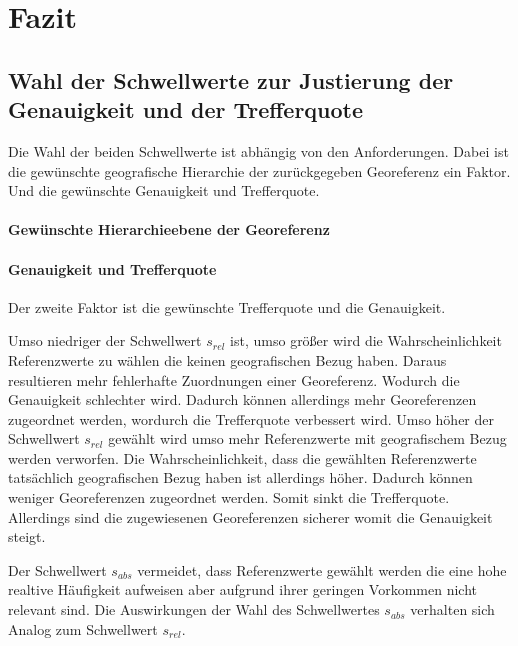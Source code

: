 
	\section{Fazit}   



		\subsection{Wahl der Schwellwerte zur Justierung der Genauigkeit und der Trefferquote}

			Die Wahl der beiden Schwellwerte ist abhängig von den Anforderungen.
			Dabei ist die gewünschte geografische Hierarchie der zurückgegeben Georeferenz ein Faktor.
			Und die gewünschte Genauigkeit und Trefferquote.
			
			\paragraph{Gewünschte Hierarchieebene der Georeferenz}

				

			\paragraph{Genauigkeit und Trefferquote} 

				Der zweite Faktor ist die gewünschte Trefferquote und die Genauigkeit.

				Umso niedriger der Schwellwert $s_{rel}$ ist, umso größer wird die Wahrscheinlichkeit Referenzwerte zu wählen die keinen geografischen Bezug haben.
				Daraus resultieren mehr fehlerhafte Zuordnungen einer Georeferenz.
				Wodurch die Genauigkeit schlechter wird.
				Dadurch können allerdings mehr Georeferenzen zugeordnet werden, wordurch die Trefferquote verbessert wird.
				Umso höher der Schwellwert $s_{rel}$ gewählt wird umso mehr Referenzwerte mit geografischem Bezug werden verworfen.
				Die Wahrscheinlichkeit, dass die gewählten Referenzwerte tatsächlich geografischen Bezug haben ist allerdings höher.
				Dadurch können weniger Georeferenzen zugeordnet werden.
				Somit sinkt die Trefferquote.
				Allerdings sind die zugewiesenen Georeferenzen sicherer womit die Genauigkeit steigt.

				Der Schwellwert $s_{abs}$ vermeidet, dass Referenzwerte gewählt werden die eine hohe realtive Häufigkeit aufweisen aber aufgrund ihrer geringen Vorkommen nicht relevant sind.
				Die Auswirkungen der Wahl des Schwellwertes $s_{abs}$ verhalten sich Analog zum Schwellwert $s_{rel}$.


